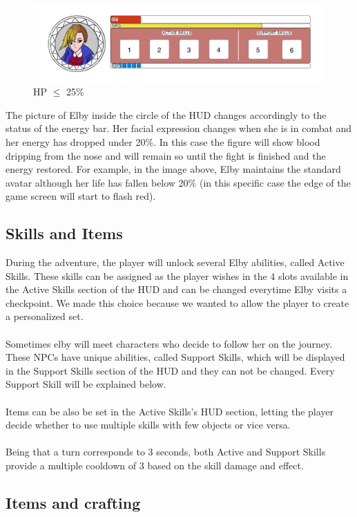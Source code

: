 \begin{figure}[H]
	\centering
	\includegraphics[width=14cm]{images/hud/HUD_life_red.png}
	\caption*{HP $\leq$ 25\%}
\end{figure}

The picture of Elby inside the circle of the HUD changes accordingly to the status of the energy bar. Her facial expression changes when she is in combat and her energy has dropped under 20\%. In this case the figure will show blood dripping from the nose and will remain so until the fight is finished and the energy restored. For example, in the image above, Elby maintains the standard avatar although her life has fallen below 20\% (in this specific case the edge of the game screen will start to flash red).

\subsection{Skills and Items}
During the adventure, the player will unlock several Elby abilities, called Active Skills. These skills can be assigned as the player wishes in the 4 slots available in the Active Skills section of the HUD and can be changed everytime Elby visits a checkpoint. We made this choice because we wanted to allow the player to create a personalized set.\\\\
Sometimes elby will meet characters who decide to follow her on the journey. These NPCs have unique abilities, called Support Skills, which will be displayed in the Support Skills section of the HUD and they can not be changed. Every Support Skill will be explained below.\\\\
Items can be also be set in the Active Skills's HUD section, letting the player decide whether to use multiple skills with few objects or vice versa.\\\\
Being that a turn corresponds to 3 seconds, both Active and Support Skills provide a multiple cooldown of 3 based on the skill damage and effect.

\subsection{Items and crafting}

